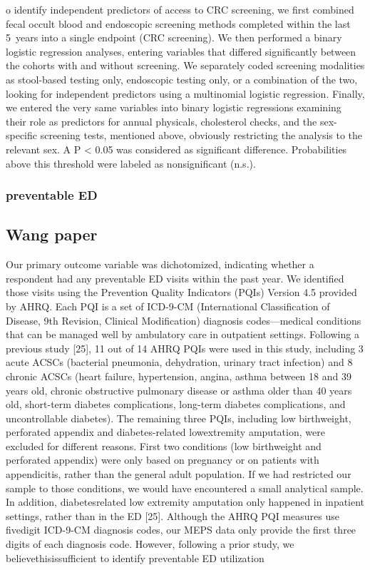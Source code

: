 \documentclass[../main.tex]{subfiles}
\begin{document}
o identify independent predictors of access to CRC screening, we first combined fecal occult blood and endoscopic screening methods completed within the last 5 years into a single endpoint (CRC screening). We then performed a binary logistic regression analyses, entering variables that differed significantly between the cohorts with and without screening. We separately coded screening modalities as stool-based testing only, endoscopic testing only, or a combination of the two, looking for independent predictors using a multinomial logistic regression. Finally, we entered the very same variables into binary logistic regressions examining their role as predictors for annual physicals, cholesterol checks, and the sex-specific screening tests, mentioned above, obviously restricting the analysis to the relevant sex. A P < 0.05 was considered as significant difference. Probabilities above this threshold were labeled as nonsignificant (n.s.).

\subsubsection{preventable ED}

\subsection{Wang paper}
Our primary outcome variable was dichotomized, indicating whether a respondent had any preventable ED visits within the past year. We identified those visits using the Prevention Quality Indicators (PQIs) Version 4.5 provided by AHRQ. Each PQI is a set of ICD-9-CM (International Classification of Disease, 9th Revision, Clinical Modification) diagnosis codes—medical conditions that can be managed well by ambulatory care in outpatient settings. Following a previous study [25], 11 out of 14 AHRQ PQIs were used in this study, including 3 acute ACSCs (bacterial pneumonia, dehydration, urinary tract infection) and 8 chronic ACSCs (heart failure, hypertension, angina, asthma between 18 and 39 years old, chronic obstructive pulmonary disease or asthma older than 40 years old, short-term diabetes complications, long-term diabetes complications, and uncontrollable diabetes). The remaining three PQIs, including low birthweight, perforated appendix and diabetes-related lowextremity amputation, were excluded for different reasons. First two conditions (low birthweight and perforated appendix) were only based on pregnancy or on patients with appendicitis, rather than the general adult population. If we had restricted our sample to those conditions, we would have encountered a small analytical sample. In addition, diabetesrelated low extremity amputation only happened in inpatient settings, rather than in the ED [25]. Although the AHRQ PQI measures use fivedigit ICD-9-CM diagnosis codes, our MEPS data only provide the first three digits of each diagnosis code. However, following a prior study, we believethisissufficient to identify preventable ED utilization
\end{document}
